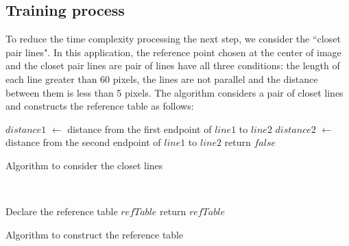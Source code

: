 \subsection{Training process}
To reduce the time complexity processing the next step, we consider the ``closet pair lines". In this application, the reference point chosen at the center of image and the closet pair lines are pair of lines have all three conditions: the length of each line greater than 60 pixels, the lines are not parallel and the distance between them is less than 5 pixels. The algorithm considers a pair of closet lines and constructs the reference table as follows:\\[0.2cm]
\begin{algorithm}[H]
\Indm 
{}
\SetAlgoLined
{}
\Indp
$distance1$ $\leftarrow$ distance from the first endpoint of $line1$ to $line2$\;
$distance2$ $\leftarrow$  distance from the second endpoint of $line1$ to $line2$\;
return $false$\;
\caption{Algorithm to consider the closet lines}
\end{algorithm}~\\[0.2cm]
\begin{algorithm}[H]
\Indm 
{}
\SetAlgoLined
{}
\Indp
Declare the reference table $refTable$ \;
return $refTable$ \;
\caption{Algorithm to construct the reference table}
\end{algorithm}~\\
